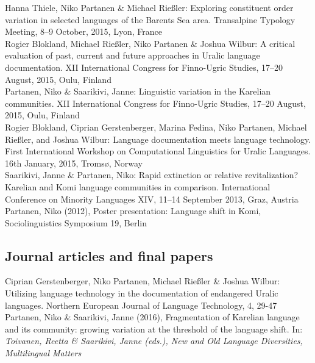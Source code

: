 \documentclass[11pt, a4paper]{article}
\newcommand{\years}[1]{\marginnote{\scriptsize #1}} %
\begin{document}
\years{2015} Hanna Thiele, Niko Partanen \& Michael Rießler: Exploring constituent order variation in selected languages of the Barents Sea area. Transalpine Typology Meeting, 8–9 October, 2015, Lyon, France\\

\years{2015} Rogier Blokland, Michael Rießler, Niko Partanen \& Joshua Wilbur: A critical evaluation of past, current and future approaches in Uralic language documentation. XII International Congress for Finno-Ugric Studies, 17–20 August, 2015, Oulu, Finland\\

\years{2015} Partanen, Niko \& Saarikivi, Janne: Linguistic variation in the Karelian communities. XII International Congress for Finno-Ugric Studies, 17–20 August, 2015, Oulu, Finland\\

\years{2014} Rogier Blokland, Ciprian Gerstenberger, Marina Fedina, Niko Partanen, Michael Rießler, and Joshua Wilbur: Language documentation meets language technology. First International Workshop on Computational Linguistics for Uralic Languages. 16th January, 2015, Tromsø, Norway\\

\years{2013} Saarikivi, Janne \& Partanen, Niko: Rapid extinction or relative revitalization? Karelian and Komi language communities in comparison. International Conference on Minority Languages XIV, 11–14 September 2013, Graz, Austria\\ 

\years{2012}Partanen, Niko (2012), Poster presentation: Language shift in Komi, Sociolinguistics Symposium 19, Berlin\\

\subsection*{Journal articles and final papers}

\years{2016} Ciprian Gerstenberger, Niko Partanen, Michael Rießler \& Joshua Wilbur: Utilizing language technology in the documentation of endangered Uralic languages. Northern European Journal of Language Technology, 4, 29-47 \\

\years{2016} Partanen, Niko \& Saarikivi, Janne (2016), Fragmentation of Karelian language and its community: growing variation at the threshold of the language shift. In: \emph{Toivanen, Reetta \& Saarikivi, Janne (eds.), New and Old Language Diversities, Multilingual Matters}\\
\end{document}
